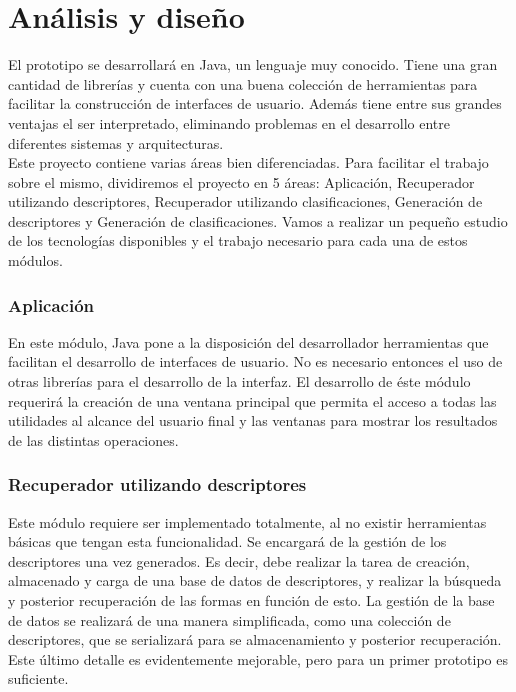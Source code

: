 \section{Análisis y diseño}

El prototipo se desarrollará en Java, un lenguaje muy conocido. Tiene una gran cantidad de librerías y cuenta con una buena colección de herramientas para facilitar la construcción de interfaces de usuario. Además tiene entre sus grandes ventajas el ser interpretado, eliminando problemas en el desarrollo entre diferentes sistemas y arquitecturas.\\ 

Este proyecto contiene varias áreas bien diferenciadas. Para facilitar el trabajo sobre el mismo, dividiremos el proyecto en 5 áreas: Aplicación, Recuperador utilizando descriptores, Recuperador utilizando clasificaciones, Generación de descriptores y Generación de clasificaciones. Vamos a realizar un pequeño estudio de los tecnologías disponibles y el trabajo necesario para cada una de estos módulos.\\

\subsubsection{Aplicación}

En este módulo, Java pone a la disposición del desarrollador herramientas que facilitan el desarrollo de interfaces de usuario. No es necesario entonces el uso de otras librerías para el desarrollo de la interfaz. El desarrollo de éste módulo requerirá la creación de una ventana principal que permita el acceso a todas las utilidades al alcance del usuario final y las ventanas para mostrar los resultados de las distintas operaciones.\\

\subsubsection{Recuperador utilizando descriptores}

Este módulo requiere ser implementado totalmente, al no existir herramientas básicas que tengan esta funcionalidad. Se encargará de la gestión de los descriptores una vez generados. Es decir, debe realizar la tarea de creación, almacenado y carga de una base de datos de descriptores, y realizar la búsqueda y posterior recuperación de las formas en función de esto. La gestión de la base de datos se realizará de una manera simplificada, como una colección de descriptores, que se serializará para se almacenamiento y posterior recuperación. Este último detalle es evidentemente mejorable, pero para un primer prototipo es suficiente.\\

